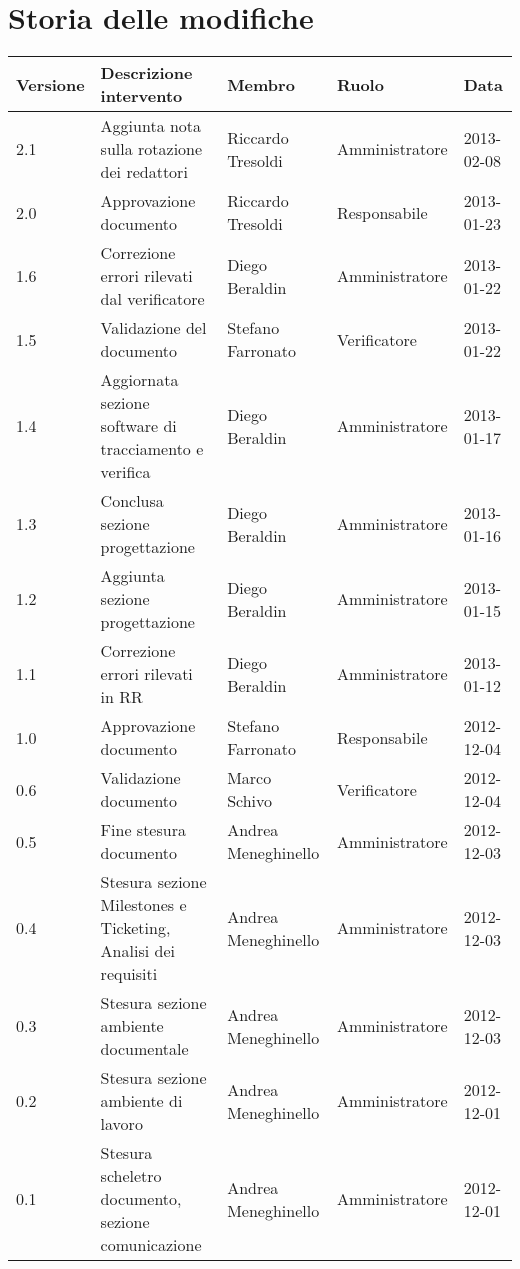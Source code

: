 \section*{Storia delle modifiche}
\begin{tabularx}{\textwidth}{lXlll}
\toprule
Versione & Descrizione intervento & Membro & Ruolo & Data\\
\midrule %
2.1 & Aggiunta nota sulla rotazione dei redattori & Riccardo Tresoldi & Amministratore & 2013-02-08\\
2.0 & Approvazione documento & Riccardo Tresoldi & Responsabile & 2013-01-23\\
1.6 & Correzione errori rilevati dal verificatore & Diego Beraldin & Amministratore & 2013-01-22\\
1.5 & Validazione del documento & Stefano Farronato & Verificatore & 2013-01-22\\
1.4 & Aggiornata sezione software di tracciamento e verifica & Diego Beraldin & Amministratore & 2013-01-17\\
1.3 & Conclusa sezione progettazione & Diego Beraldin & Amministratore & 2013-01-16\\
1.2 & Aggiunta sezione progettazione & Diego Beraldin & Amministratore & 2013-01-15\\
1.1 & Correzione errori rilevati in RR & Diego Beraldin & Amministratore & 2013-01-12\\
1.0 & Approvazione documento & Stefano Farronato & Responsabile & 2012-12-04\\
0.6 & Validazione documento & Marco Schivo & Verificatore & 2012-12-04\\
0.5 & Fine stesura documento & Andrea Meneghinello & Amministratore & 2012-12-03\\
0.4 & Stesura sezione Milestones e Ticketing, Analisi dei requisiti & Andrea Meneghinello & Amministratore & 2012-12-03\\
0.3 & Stesura sezione ambiente documentale & Andrea Meneghinello & Amministratore & 2012-12-03\\
0.2 & Stesura sezione ambiente di lavoro & Andrea Meneghinello & Amministratore & 2012-12-01\\
0.1 & Stesura scheletro documento, sezione comunicazione & Andrea Meneghinello & Amministratore & 2012-12-01\\
\bottomrule
\end{tabularx}
\newpage



